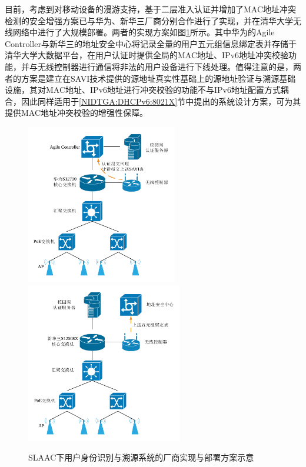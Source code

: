     目前，考虑到对移动设备的漫游支持，基于二层准入认证并增加了MAC地址冲突检测的安全增强方案已与华为、新华三厂商分别合作进行了实现，并在清华大学无线网络中进行了大规模部署。两者的实现方案如图\ref{fig:Tsinghua_SAVI_implementation}所示。其中华为的Agile Controller与新华三的地址安全中心将记录全量的用户五元组信息绑定表并存储于清华大学大数据平台，在用户认证时提供全局的MAC地址、IPv6地址冲突校验功能，并与无线控制器进行通信将非法的用户设备进行下线处理。值得注意的是，两者的方案是建立在SAVI技术提供的源地址真实性基础上的源地址验证与溯源基础设施，其对MAC地址、IPv6地址进行冲突校验的功能不与IPv6地址配置方式耦合，因此同样适用于\ref{NIDTGA:DHCPv6:8021X}节中提出的系统设计方案，可为其提供MAC地址冲突校验的增强性保障。
    
    \begin{figure}[ht]
        \centering
        {\includegraphics[height=7cm]{figures/Tsinghua_SAVI_huawei.png}}
        {\includegraphics[height=7cm]{figures/Tsinghua_SAVI_h3c.png}}
        \caption{SLAAC下用户身份识别与溯源系统的厂商实现与部署方案示意}
        \label{fig:Tsinghua_SAVI_implementation}
    \end{figure}


